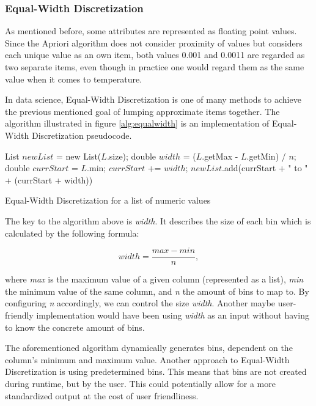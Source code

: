 \documentclass[bachelor,english]{info1thesis}
\begin{document}
\subsubsection{Equal-Width Discretization}
\label{sec:equalwidth}
As mentioned before, some attributes are represented as floating point values. Since the Apriori algorithm does not consider proximity of values but considers each unique value as an own item, both values 0.001 and 0.0011 are regarded as two separate items, even though in practice one would regard them as the same value when it comes to temperature.

In data science, Equal-Width Discretization is one of many methods to achieve the previous mentioned goal of lumping approximate items together. The algorithm illustrated in figure \ref{alg:equalwidth} is an implementation of Equal-Width Discretization pseudocode.

   \begin{algorithm}
     \SetAlgoLined
     List $newList$ = new List($L$.size);\newline
     double $width$ = ($L$.getMax - $L$.getMin) / $n$;\newline
     double $currStart$ = $L$.min;\newline
     {
     	     		{$currStart$ += $width$;}
     	$newList$.add(currStart + " to " + (currStart + width))
     }
     \caption{Equal-Width Discretization for a list of numeric values}
     \label{alg:equalwidth}
     	\vspace{1cm}
   \end{algorithm}
The key to the algorithm above is \textit{width}. It describes the size of each bin which is calculated by the following formula:

\[width = \frac{max - min}{n},\]
	\vspace{0.5cm}

where \textit{max} is the maximum value of a given column (represented as a list), \textit{min} the minimum value of the same column, and \textit{n} the amount of bins to map to. By configuring \textit{n} accordingly, we can control the size \textit{width}. Another maybe user-friendly implementation would have been using \textit{width} as an input without having to know the concrete amount of bins.


The aforementioned algorithm dynamically generates bins, dependent on the column's minimum and maximum value. Another approach to Equal-Width Discretization is using predetermined bins. This means that bins are not created during runtime, but by the user. This could potentially allow for a more standardized output at the cost of user friendliness.
\end{document}
